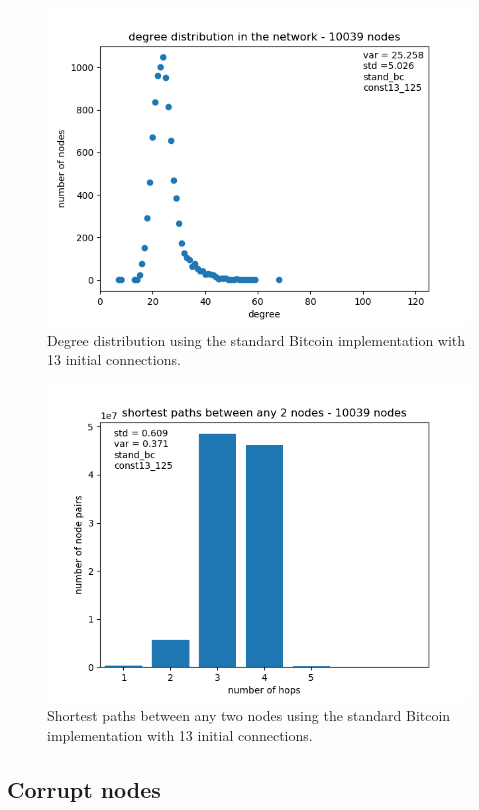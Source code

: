 \documentclass[a4paper, oneside]{discothesis}
\begin{document}
\begin{figure}
    \centering
    \includegraphics[width=.8\columnwidth]{figures/initConnectDistribution/const13/degree-distribution-10039-nodes.png}
    \caption{Degree distribution using the standard Bitcoin implementation with 13 initial connections.}
    \label{fig:initConnectDistributionConst13Degree}
\end{figure}

\begin{figure}
    \centering
    \includegraphics[width=.8\columnwidth]{figures/initConnectDistribution/const13/final-shortest-paths-between-any-nodes-10039-nodes.png}
    \caption{Shortest paths between any two nodes using the standard Bitcoin implementation with 13 initial connections.}
    \label{fig:initConnectDistributionConst13ShortestPath}
\end{figure}

\subsection{Corrupt nodes}
\end{document}
